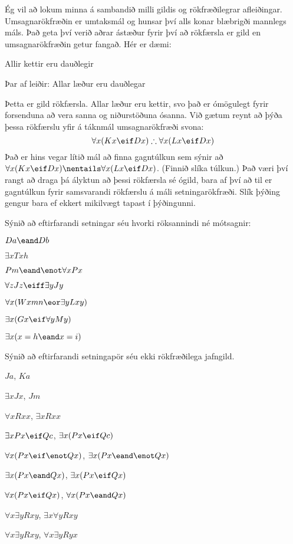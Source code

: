 Ég vil að lokum minna á sambandið milli gildis og rökfræðilegrar afleiðingar. Umsagnarökfræðin er umtaksmál og hunsar því alls konar blæbrigði mannlegs máls. Það geta því verið aðrar ástæður fyrir því að rökfærsla er gild en umsagnarökfræðin getur fangað. Hér er dæmi:
\begin{earg}
	\item[] Allir kettir eru dauðlegir
	\item[Þar af leiðir:] Allar læður eru dauðlegar
\end{earg}
Þetta er gild rökfærsla. Allar læður eru kettir, svo það er ómögulegt fyrir forsenduna að vera sanna og niðurstöðuna ósanna. Við gætum reynt að þýða þessa rökfærslu yfir á táknmál umsagnarökfræði svona:
$$\forall x(Kx \eif Dx) \therefore \forall x(Lx \eif  Dx)$$
Það er hins vegar lítið mál að finna gagntúlkun sem sýnir að $\forall x (Kx \eif Dx) \nentails \forall x (Lx \eif Dx)$. (Finnið slíka túlkun.) Það væri því rangt að draga þá ályktun að þessi rökfærsla sé ógild, bara af því að til er gagntúlkun fyrir samsvarandi rökfærslu á máli setningarökfræði. Slík þýðing gengur bara ef ekkert mikilvægt tapast í þýðingunni.

\practiceproblems

\problempart
\label{pr.Contingent}
Sýnið að eftirfarandi setningar séu hvorki röksannindi né mótsagnir:
\begin{earg}
\item  $Da \eand Db$
\item  $\exists x Txh$
\item  $Pm \eand \enot\forall x Px$
\item $\forall z Jz \eiff \exists y Jy$
\item $\forall x (Wxmn \eor \exists yLxy)$
\item $\exists x (Gx \eif \forall y My)$
\item $\exists x (x = h \eand x = i)$
\end{earg}

\problempart
\label{pr.NotEquiv}
Sýnið að eftirfarandi setningapör séu ekki rökfræðilega jafngild.
\begin{earg}
\item $Ja$, $Ka$
\item $\exists x Jx$, $Jm$
\item $\forall x Rxx$, $\exists x Rxx$
\item $\exists x Px \eif Qc$, $\exists x (Px \eif Qc)$
\item $\forall x(Px \eif \enot Qx)$, $\exists x(Px \eand \enot Qx)$
\item $\exists x(Px \eand Qx)$, $\exists x(Px \eif Qx)$
\item $\forall x(Px\eif Qx)$, $\forall x(Px \eand Qx)$
\item $\forall x\exists y Rxy$, $\exists x\forall y Rxy$
\item $\forall x\exists y Rxy$, $\forall x\exists y Ryx$
\end{earg}




